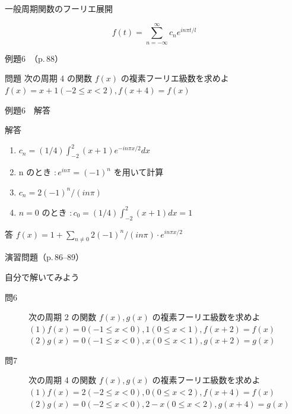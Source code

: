 \documentclass[aspectratio=43,professionalfonts,handout]{beamer}
\begin{document}
\begin{frame}{一般周期関数のフーリエ展開}
  \begin{block}{}
  \[
    f(t) = \sum_{n=-\infty}^{\infty} c_{n} e^{in\pi t/l}
  \]
  \end{block}
\end{frame}

\begin{frame}{例題6　（p.\,88）}
  \begin{exampleblock}{問題}
    次の周期 4 の関数 $f(x)$ の複素フーリエ級数を求めよ\\[2pt]
    $f(x) = x + 1  (-2 \leq x < 2),  f(x+4) = f(x)$\\[2pt]
  \end{exampleblock}
\end{frame}

\begin{frame}{例題6　解答}
  \begin{exampleblock}{解答}
  \begin{enumerate}[1.]
    \item[] $c_{n} = (1/4) \int_{-2}^{2} (x+1) e^{-in\pi x/2} dx$
    \item[] n  のとき $: e^{in\pi} = (-1)^n$ を用いて計算
    \item[] $c_{n} = 2(-1)^n / (in\pi)$
    \item[] $n = 0$ のとき $: c_{0} = (1/4)\int_{-2}^{2}(x+1)dx = 1$
  \end{enumerate}
  \end{exampleblock}
  \begin{alertblock}{答}
    $f(x) = 1 + \sum_{n\neq0} 2(-1)^n/(in\pi) \cdot e^{in\pi x/2}$
  \end{alertblock}
\end{frame}

\begin{frame}{演習問題（p.\,86--89）}
  \begin{exampleblock}{自分で解いてみよう}
  \begin{description}
    \item[問6] 次の周期 2 の関数 $f(x), g(x)$ の複素フーリエ級数を求めよ
    $(1) f(x) = { 0  (-1 \leq x < 0),  1  (0 \leq x < 1) },  f(x+2) = f(x)$\\
    $(2) g(x) = { 0  (-1 \leq x < 0),  x  (0 \leq x < 1) },  g(x+2) = g(x)$\\
    \item[問7] 次の周期 4 の関数 $f(x), g(x)$ の複素フーリエ級数を求めよ
    $(1) f(x) = { 2  (-2 \leq x < 0),  0  (0 \leq x < 2) },  f(x+4) = f(x)$\\
    $(2) g(x) = { 0  (-2 \leq x < 0),  2-x  (0 \leq x < 2) },  g(x+4) = g(x)$\\
  \end{description}
  \end{exampleblock}
\end{frame}
\end{document}
